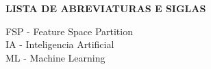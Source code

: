 \thispagestyle{empty}
\begin{center}
\textbf{\MakeUppercase{Lista de Abreviaturas e Siglas}}
\end{center}
\vspace{0.5cm}
\begin{spacing}{2}
\noindent
FSP - Feature Space Partition\\
IA - Inteligencia Artificial\\
ML - Machine Learning
\end{spacing}
\newpage
